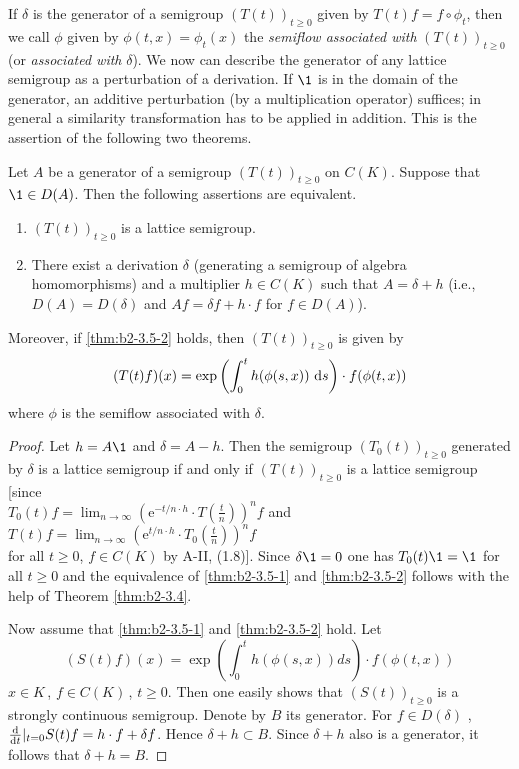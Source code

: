 If $\delta$ is the generator of a semigroup $(T(t))_{t \geq 0}$ given by $T(t)f = f \circ \phi_{t}$, then we call $\phi$ given by $\phi(t,x) = \phi_{t}(x)$ the \emph{semiflow associated with} $(T(t))_{t \geq 0}$ (or \emph{associated with} $\delta$).
We now can describe the generator of any lattice semigroup as a perturbation of a derivation.
If $\1$ is in the domain of the generator, an additive perturbation (by a multiplication operator) suffices; in general a similarity transformation has to be applied in addition.
This is the assertion of the following two theorems.

\begin{theorem}\label{thm:b2-3.5}
Let $A$ be a generator of a semigroup $(T(t))_{t \geq 0}$ on $C(K)$.
Suppose that $\1 \in D(A)$.
Then the following assertions are equivalent.
\begin{enumerate}[\upshape (a)]
\item \label{thm:b2-3.5-1}
$(T(t))_{t \geq 0}$ is a lattice semigroup.
\item \label{thm:b2-3.5-2}
There exist a derivation $\delta$ (generating a semigroup of algebra homomorphisms) and a multiplier $h \in C(K)$ such that $A = \delta + h$ (i.e., $D(A) = D(\delta)$ and $Af = \delta f + h \cdot f$ for $f \in D(A)$).
\end{enumerate}

Moreover, if \ref{thm:b2-3.5-2} holds, then $(T(t))_{t \geq 0}$ is given by
\begin{equation}\label{eq:b2-3.6}
(T(t)f)(x) = \exp\left(\int_{0}^{t} h(\phi(s,x))\,\mathop{}\!\mathrm{d}{s}\right) \cdot f(\phi(t,x))
\end{equation}
where $\phi$ is the semiflow associated with $\delta$.
\end{theorem}

\begin{proof}
Let $h = A\1$ and $\delta = A - h$.
Then the semigroup $(T_{0}(t))_{t \geq 0}$ generated by $\delta$ is a lattice semigroup if and only if $(T(t))_{t \geq 0}$ is a lattice semigroup [since \\
 $T_{0}(t)f = \lim_{n \to \infty} (\mathrm{e}^{-t/n \cdot h} \cdot T(\frac{t}{n}))^{n}f$ 
 and 
 $T(t)f = \lim_{n \to \infty} (\mathrm{e}^{t/n \cdot h} \cdot T_{0}(\frac{t}{n}))^{n}f$ \\
 for all $t \geq 0$, $f \in C(K)$ by
A-II, (1.8)].
Since $\delta \1 = 0$ one has $T_{0}(t)\1 = \1$ for all $t \geq 0$ and the equivalence of \ref{thm:b2-3.5-1} and \ref{thm:b2-3.5-2} follows with the help of Theorem \ref{thm:b2-3.4}.

Now assume that \ref{thm:b2-3.5-1} and \ref{thm:b2-3.5-2} hold.
Let
\[
(S(t)f) (x) = \exp\left( \int_{0}^{t} h(\phi(s,x))ds \right) \cdot f(\phi(t,x))
\]
$x \in K$\,, $f \in C (K)$\,, $t \geq 0$. 
Then one easily shows that $(S(t))_{t\geq 0}$ is a strongly con\-tinu\-ous semigroup.
Denote by $B$ its generator.
For $f \in D(\delta)$ , $\frac{\mathop{}\!\mathrm{d}{}}{\mathop{}\!\mathrm{d}{t}}|_{t = 0}S(t)f = h \cdot f + \delta f$.
Hence $\delta + h \subset B$.  Since $\delta + h$ also is a generator, it follows that $\delta + h = B$.
\end{proof}


